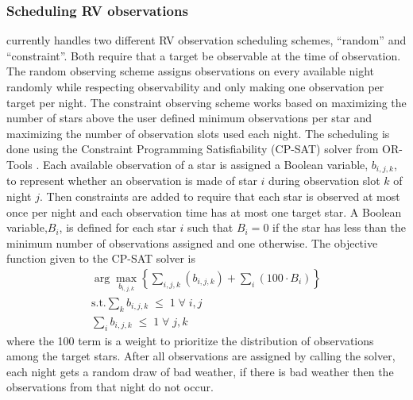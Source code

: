\subsubsection{Scheduling RV observations}

 currently handles two different RV observation scheduling schemes,
``random'' and ``constraint''. Both require that a target be observable at the time
of observation. The random observing scheme assigns observations on every
available night randomly while respecting observability and only making one
observation per target per night. The constraint observing scheme works based
on maximizing the number of stars above the user defined minimum observations
per star and maximizing the number of observation slots used each night. The
scheduling is done using the Constraint Programming Satisfiability (CP-SAT)
solver from OR-Tools \citep{perronORTools2022}. Each available observation of a
star is assigned a Boolean variable, $b_{i,j,k}$, to represent whether an
observation is made of star $i$ during observation slot $k$ of night $j$. Then
constraints are added to require that each star is observed at most once per
night and each observation time has at most one target star. A Boolean
variable,$B_i$, is defined for each star $i$ such that $B_i = 0$ if the
star has less than the minimum number of observations assigned and one
otherwise. The objective function given to the CP-SAT solver is
\begin{gather}
  \arg{\max_{b_{i,j,k}}} \left\{ \sum_{i,j,k}\left(
  b_{i,j,k}\right) + \sum_i\left( 100 \cdot B_{i}\right)
  \right\}\\
  \textrm{s.t.}
  \sum_k b_{i,j,k} \; \leq \; 1 \; \forall \; i,j\\
  \sum_i b_{i,j,k} \; \leq \; 1 \; \forall \; j,k
  \label{eq:rv_objective}
\end{gather}
where the 100 term is a weight to prioritize the distribution of
observations among the target stars. After all observations are assigned by
calling the solver, each night gets a random draw of bad weather, if there is
bad weather then the observations from that night do not occur.

